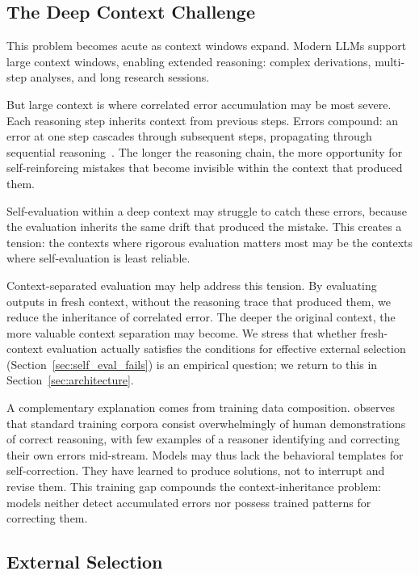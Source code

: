 \documentclass[11pt]{article}
\begin{document}
\subsection{The Deep Context Challenge}

This problem becomes acute as context windows expand. Modern LLMs support large context
windows, enabling extended reasoning: complex derivations, multi-step analyses, and long
research sessions.

But large context is where correlated error accumulation may be most severe. Each reasoning
step inherits context from previous steps. Errors compound: an error at one step cascades
through subsequent steps, propagating through sequential
reasoning~\citep{tyen2024llmsstepbystep}. The longer the reasoning chain, the more
opportunity for self-reinforcing mistakes that become invisible within the context that
produced them.

Self-evaluation within a deep context may struggle to catch these errors, because the
evaluation inherits the same drift that produced the mistake. This creates a tension: the
contexts where rigorous evaluation matters most may be the contexts where self-evaluation is
least reliable.

Context-separated evaluation may help address this tension. By evaluating outputs in fresh
context, without the reasoning trace that produced them, we reduce the inheritance of
correlated error. The deeper the original context, the more valuable context separation may
become. We stress that whether fresh-context evaluation actually satisfies the conditions for
effective external selection (Section~\ref{sec:self_eval_fails}) is an empirical question;
we return to this in Section~\ref{sec:architecture}.

A complementary explanation comes from training data composition. \citet{tsui2025selfcorrection}
observes that standard training corpora consist overwhelmingly of human demonstrations of
correct reasoning, with few examples of a reasoner identifying and correcting their own
errors mid-stream. Models may thus lack the behavioral templates for self-correction. They
have learned to produce solutions, not to interrupt and revise them. This training gap
compounds the context-inheritance problem: models neither detect accumulated errors nor
possess trained patterns for correcting them.

\subsection{External Selection}
\end{document}
